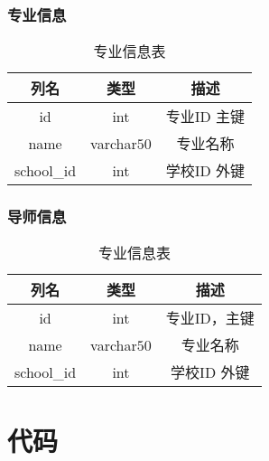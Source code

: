\documentclass[UTF8]{ctexart}
\begin{document}
    \subsubsection{专业信息}
    \begin{table}[h!]
        \centering
        \caption{专业信息表}
        \begin{tabular}{ccc}
        \hline
        列名 & 类型 & 描述 \\
        \hline
        id & int & 专业ID 主键 \\
        name & varchar\(50\) & 专业名称 \\
        school\_id & int & 学校ID 外键 \\
        \hline
        \end{tabular}
        \label{tab:major_info}
    \end{table}
    \subsubsection{导师信息}
    \begin{table}[h!]
        \centering
        \caption{专业信息表}
        \begin{tabular}{ccc}
        \hline
        列名 & 类型 & 描述 \\
        \hline
        id & int & 专业ID，主键 \\
        name & varchar\(50\) & 专业名称 \\
        school\_id & int & 学校ID 外键 \\
        \hline
        \end{tabular}
        \label{tab:major_info}
    \end{table}
    
    \section{代码}
\end{document}
